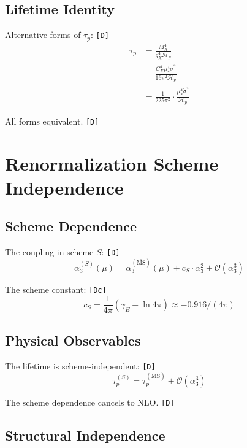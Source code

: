 \documentclass[11pt,a4paper]{article}
\newcommand{\tagD}{\textcolor{green!50!black}{\texttt{[D]}}}
\newcommand{\tagDc}{\textcolor{blue!70!black}{\texttt{[Dc]}}}
\theoremstyle{definition}
\begin{document}
\subsection{Lifetime Identity}
\label{app:tau-ident}

Alternative forms of $\tau_p$: \tagD{}
\begin{align}
\label{eq:tau-alt-1}
\tau_p &= \frac{M_X^4}{g_X^4\mathcal{H}_p} \\
\label{eq:tau-alt-2}
&= \frac{C_X^4\mu_*^4\tilde{\sigma}^4}{16\pi^2\mathcal{H}_p} \\
\label{eq:tau-alt-3}
&= \frac{1}{225\pi^2}\cdot\frac{\mu_*^4\tilde{\sigma}^4}{\mathcal{H}_p}
\end{align}

All forms equivalent. \tagD{}

\section{Renormalization Scheme Independence}
\label{app:scheme}

\subsection{Scheme Dependence}
\label{app:scheme-dep}

The coupling in scheme $S$: \tagD{}
\begin{equation}
\label{eq:scheme-1}
\alpha_3^{(S)}(\mu) = \alpha_3^{(\bar{\text{MS}})}(\mu) + c_S \cdot \alpha_3^2 + \mathcal{O}(\alpha_3^3)
\end{equation}

The scheme constant: \tagDc{}
\begin{equation}
\label{eq:scheme-2}
c_S = \frac{1}{4\pi}\left(\gamma_E - \ln 4\pi\right) \approx -0.916/(4\pi)
\end{equation}

\subsection{Physical Observables}
\label{app:phys-obs}

The lifetime is scheme-independent: \tagD{}
\begin{equation}
\label{eq:phys-1}
\tau_p^{(S)} = \tau_p^{(\bar{\text{MS}})} + \mathcal{O}(\alpha_3^3)
\end{equation}

The scheme dependence cancels to NLO. \tagD{}

\subsection{Structural Independence}
\label{app:struct-ind}
\end{document}
